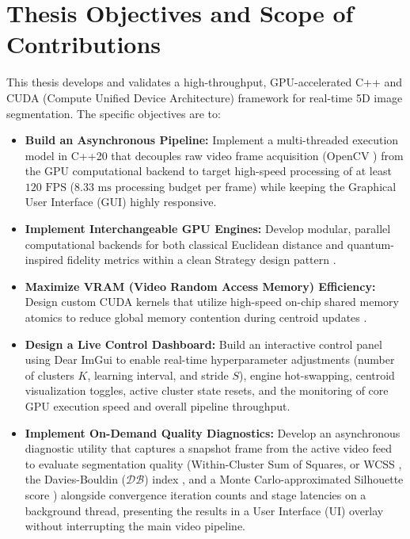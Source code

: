 \section{Thesis Objectives and Scope of Contributions}
This thesis develops and validates a high-throughput, GPU-accelerated C++ and CUDA (Compute Unified Device Architecture) framework for real-time 5D image segmentation. The specific objectives are to:
\begin{itemize}
    \item \textbf{Build an Asynchronous Pipeline:} Implement a multi-threaded execution model in C++20 that decouples raw video frame acquisition (OpenCV \cite{Bradski2000}) from the GPU computational backend to target high-speed processing of at least $120\text{ FPS}$ ($8.33\text{ ms}$ processing budget per frame) while keeping the Graphical User Interface (GUI) highly responsive.
    \item \textbf{Implement Interchangeable GPU Engines:} Develop modular, parallel computational backends for both classical Euclidean distance and quantum-inspired fidelity metrics within a clean Strategy design pattern \cite{gamma1995design}.
    \item \textbf{Maximize VRAM (Video Random Access Memory) Efficiency:} Design custom CUDA kernels that utilize high-speed on-chip shared memory atomics to reduce global memory contention during centroid updates \cite{CudaGuide}.
    \item \textbf{Design a Live Control Dashboard:} Build an interactive control panel using Dear ImGui \cite{ImGui} to enable real-time hyperparameter adjustments (number of clusters $K$, learning interval, and stride $S$), engine hot-swapping, centroid visualization toggles, active cluster state resets, and the monitoring of core GPU execution speed and overall pipeline throughput.
    \item \textbf{Implement On-Demand Quality Diagnostics:} Develop an asynchronous diagnostic utility that captures a snapshot frame from the active video feed to evaluate segmentation quality (Within-Cluster Sum of Squares, or WCSS \cite{lloyd1982least, krzanowski1988criterion}, the Davies-Bouldin ($\mathcal{D}\mathcal{B}$) index \cite{davies1979cluster,xiao2017davies}, and a Monte Carlo-approximated Silhouette score \cite{shutaywi2021silhouette, rousseeuw1987silhouettes}) alongside convergence iteration counts and stage latencies on a background thread, presenting the results in a User Interface (UI) overlay without interrupting the main video pipeline.
\end{itemize}

